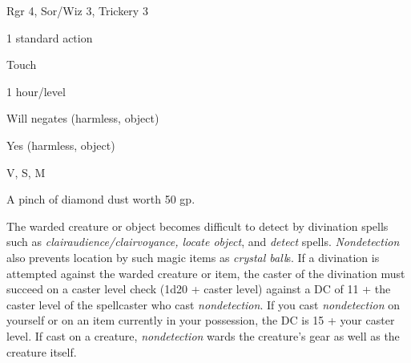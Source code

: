 
\begin{description*}
\item[Level:] Rgr 4, Sor/Wiz 3, Trickery 3
\item[Casting Time:] 1 standard action
\item[Range:] Touch
\item[Duration:] 1 hour/level
\item[Saving Throw:] Will negates (harmless, object)
\item[Spell Resistance:] Yes (harmless, object)
\item[Components:] V, S, M
\item[Arcane Material Component:] A pinch of diamond dust worth 50 gp.
\end{description*}

The warded creature or object becomes difficult to detect by divination spells
such as \textit{clairaudience/clairvoyance, locate object}, and \textit{detect
}spells. \textit{Nondetection} also prevents location by such magic items as \textit{crystal
ball}s. If a divination is attempted against the warded creature or item, the caster
of the divination must succeed on a caster level check (1d20 + caster level) against
a DC of 11 + the caster level of the spellcaster who cast \textit{nondetection}.
If you cast \textit{nondetection} on yourself or on an item currently in your possession,
the DC is 15 + your caster level.
If cast on a creature, \textit{nondetection} wards the creature's gear as well
as the creature itself.